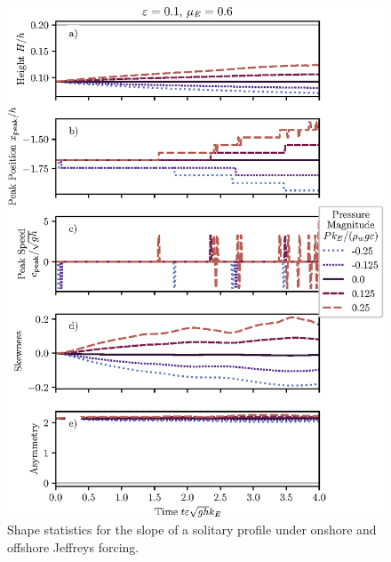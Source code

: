 \documentclass{jfm}
\begin{document}
\begin{figure}
  \centering
  \includegraphics{Slope-Skew-Asymm.eps}
  \caption{
    Shape statistics for the slope of a solitary profile under onshore
    and offshore Jeffreys forcing.
  }
\end{figure}
\end{document}
